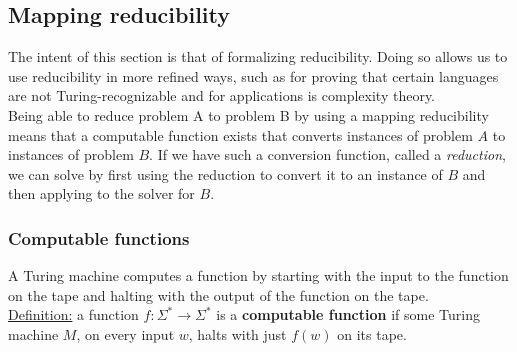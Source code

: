 \documentclass[a4paper]{article}
\begin{document}
\subsection{Mapping reducibility} %
\label{sub:Mapping reducibility}
The intent of this section is that of formalizing reducibility. Doing so allows us to use reducibility in more refined ways, such as for proving that certain languages are not Turing-recognizable and for applications is complexity theory.\\
Being able to reduce problem A to problem B by using a mapping reducibility means that a computable function exists that converts instances of problem $A$ to instances of problem $B$. If we have such a conversion function, called a \emph{reduction}, we can solve by first using the reduction to convert it to an instance of $B$ and then applying to the solver for $B$.\\
\subsubsection{Computable functions}
A Turing machine computes a function by starting with the input to the function on the tape and halting with the output of the function on the tape.\\
\underline{Definition:} a function $f:\Sigma^*\rightarrow\Sigma^*$ is a {\bf computable function} if some Turing machine $M$, on every input $w$, halts with just $f(w)$ on its tape.
\end{document}
